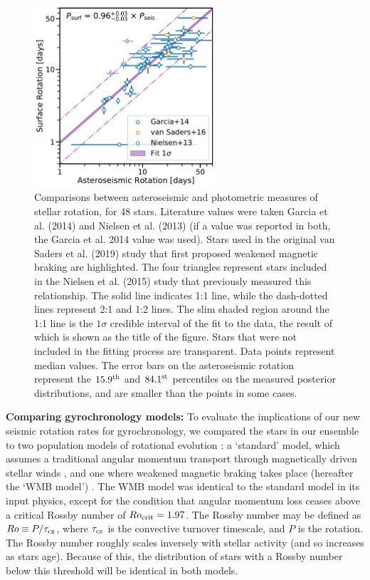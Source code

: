 \documentclass[12pt]{article}
\newcommand{\rtwo}[1]{{#1}}
\begin{document}
\begin{figure}[h!]
	\centering
	\includegraphics[width=0.6\textwidth]{Images/surf-seis-comparison_update.pdf}
	\caption{Comparisons between asteroseismic and photometric measures of stellar rotation, for 48 stars. Literature values were taken Garcia et al. (2014) \cite{garcia+2014} and Nielsen et al. (2013) \cite{nielsen+2013} (if a value was reported in both, the Garcia et al. 2014 value was used). Stars used in the original van Saders et al. (2019) \cite{vansaders+2016} study that first proposed weakened magnetic braking are highlighted. The four triangles represent stars included in the Nielsen et al. (2015) study \cite{nielsen+2015} that previously measured this relationship. The solid line indicates 1:1 line, while the dash-dotted lines represent 2:1 and 1:2 lines. The slim shaded region around the 1:1 line is the $1\sigma$ credible interval of the fit to the data, the result of which is shown as the title of the figure. Stars that were not included in the fitting process are transparent. Data points represent median values. The error bars on the asteroseismic rotation represent the $15.9^{\rm th}$ and $84.1^{\rm st}$ percentiles on the measured posterior distributions, and are smaller than the points in some cases.}
	\label{fig:protlit}
\end{figure}

\textbf{Comparing gyrochronology models:} To evaluate the implications of our \rtwo{new seismic rotation rates} for gyrochronology, we compared \rtwo{the stars in our ensemble} to two population models of rotational evolution \cite{vansaders+2019}: a `standard' model, which assumes a traditional angular momentum transport through magnetically driven stellar winds \cite{vansaders+2016,skumanich1972, kawaler1988}, and one where weakened magnetic braking takes place (hereafter the `WMB model') \cite{vansaders+2016}.  The WMB model was identical to the standard model in its input physics, except for the condition that angular momentum loss ceases above a critical Rossby number of $Ro_{\rm crit} = 1.97$. The Rossby number may be defined as $Ro \equiv P/\tau_{\rm cz}$, where $\tau_{\rm cz}$ is the convective turnover timescale, and $P$ is the rotation. The Rossby number roughly scales inversely with stellar activity (and so increases as stars age). \rtwo{Because of this, the distribution of stars with a Rossby number below this threshold will be identical in both models}.
\end{document}
